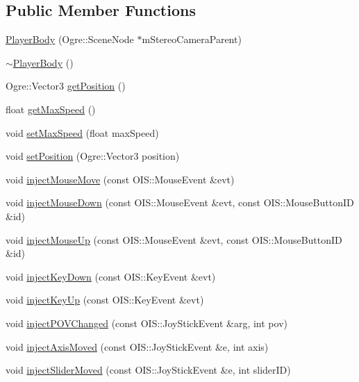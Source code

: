 \subsection*{\-Public \-Member \-Functions}
\begin{DoxyCompactItemize}
\item 
\hyperlink{classPlayerBody_acb15ca4d34a86bffcad6b00ce35d126b}{\-Player\-Body} (\-Ogre\-::\-Scene\-Node $\ast$m\-Stereo\-Camera\-Parent)
\item 
\hyperlink{classPlayerBody_aacd45e58011ac14ea72a2323cd0d1099}{$\sim$\-Player\-Body} ()
\item 
\-Ogre\-::\-Vector3 \hyperlink{classPlayerBody_ab8f4395174911c4dbbdfbfe7f920fe31}{get\-Position} ()
\item 
float \hyperlink{classPlayerBody_a087fe642e3fce240e9dd1aad99146632}{get\-Max\-Speed} ()
\item 
void \hyperlink{classPlayerBody_ad38c930b63eb6932a8e0aa3d02e2f7ba}{set\-Max\-Speed} (float max\-Speed)
\item 
void \hyperlink{classPlayerBody_a88ee65b1a7bde139f08f3d42fb6be93a}{set\-Position} (\-Ogre\-::\-Vector3 position)
\item 
void \hyperlink{classPlayerBody_ab76bcf5cc871429f084c31b163c9f4e0}{inject\-Mouse\-Move} (const \-O\-I\-S\-::\-Mouse\-Event \&evt)
\item 
void \hyperlink{classPlayerBody_acbb6f13451daa2b31d26483a5f32d871}{inject\-Mouse\-Down} (const \-O\-I\-S\-::\-Mouse\-Event \&evt, const \-O\-I\-S\-::\-Mouse\-Button\-I\-D \&id)
\item 
void \hyperlink{classPlayerBody_a82db56db31131985c575e8e8f7dc01c3}{inject\-Mouse\-Up} (const \-O\-I\-S\-::\-Mouse\-Event \&evt, const \-O\-I\-S\-::\-Mouse\-Button\-I\-D \&id)
\item 
void \hyperlink{classPlayerBody_a0a4d5790b5d7f762e228b93fea1a486f}{inject\-Key\-Down} (const \-O\-I\-S\-::\-Key\-Event \&evt)
\item 
void \hyperlink{classPlayerBody_ae4281332cffc0db75de977d9a0b48613}{inject\-Key\-Up} (const \-O\-I\-S\-::\-Key\-Event \&evt)
\item 
void \hyperlink{classPlayerBody_a31986795b00331e48fc3dc160676a143}{inject\-P\-O\-V\-Changed} (const \-O\-I\-S\-::\-Joy\-Stick\-Event \&arg, int pov)
\item 
void \hyperlink{classPlayerBody_a28b2eae6067e2ad2c30efc96b0005ca5}{inject\-Axis\-Moved} (const \-O\-I\-S\-::\-Joy\-Stick\-Event \&e, int axis)
\item 
void \hyperlink{classPlayerBody_ae7dfd55490816113a27a8424ed175b12}{inject\-Slider\-Moved} (const \-O\-I\-S\-::\-Joy\-Stick\-Event \&e, int slider\-I\-D)

\end{DoxyCompactItemize}
